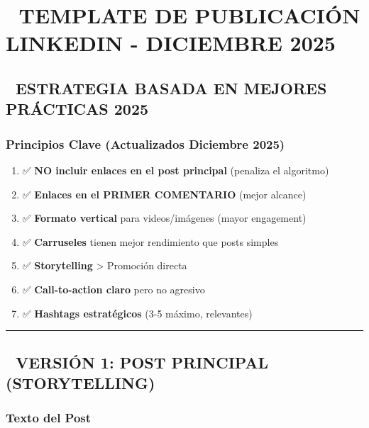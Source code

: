 \documentclass[
]{article}
\author{}
\date{\vspace{-2.5em}}
\providecommand{\tightlist}{%
  \setlength{\itemsep}{0pt}\setlength{\parskip}{0pt}}
\begin{document}
\section{📱 TEMPLATE DE PUBLICACIÓN LINKEDIN - DICIEMBRE
2025}\label{template-de-publicaciuxf3n-linkedin---diciembre-2025}

\subsection{🎯 ESTRATEGIA BASADA EN MEJORES PRÁCTICAS
2025}\label{estrategia-basada-en-mejores-pruxe1cticas-2025}

\subsubsection{Principios Clave (Actualizados Diciembre
2025)}\label{principios-clave-actualizados-diciembre-2025}

\begin{enumerate}
\def\labelenumi{\arabic{enumi}.}
\tightlist
\item
  ✅ \textbf{NO incluir enlaces en el post principal} (penaliza el
  algoritmo)
\item
  ✅ \textbf{Enlaces en el PRIMER COMENTARIO} (mejor alcance)
\item
  ✅ \textbf{Formato vertical} para videos/imágenes (mayor engagement)
\item
  ✅ \textbf{Carruseles} tienen mejor rendimiento que posts simples
\item
  ✅ \textbf{Storytelling} \textgreater{} Promoción directa
\item
  ✅ \textbf{Call-to-action claro} pero no agresivo
\item
  ✅ \textbf{Hashtags estratégicos} (3-5 máximo, relevantes)
\end{enumerate}

\begin{center}\rule{0.5\linewidth}{0.5pt}\end{center}

\subsection{📝 VERSIÓN 1: POST PRINCIPAL
(STORYTELLING)}\label{versiuxf3n-1-post-principal-storytelling}

\subsubsection{Texto del Post}\label{texto-del-post}
\end{document}
